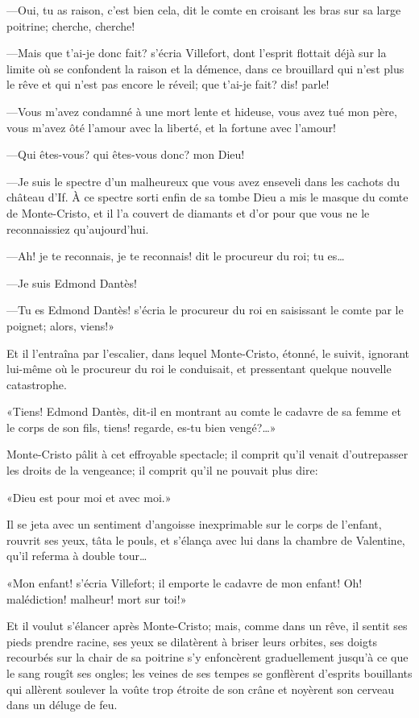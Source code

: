 —Oui, tu as raison, c'est bien cela, dit le comte en croisant les bras sur sa large poitrine; cherche, cherche! 

—Mais que t'ai-je donc fait? s'écria Villefort, dont l'esprit flottait déjà sur la limite où se confondent la raison et la démence, dans ce brouillard qui n'est plus le rêve et qui n'est pas encore le réveil; que t'ai-je fait? dis! parle! 

—Vous m'avez condamné à une mort lente et hideuse, vous avez tué mon père, vous m'avez ôté l'amour avec la liberté, et la fortune avec l'amour! 

—Qui êtes-vous? qui êtes-vous donc? mon Dieu! 

—Je suis le spectre d'un malheureux que vous avez enseveli dans les cachots du château d'If. À ce spectre sorti enfin de sa tombe Dieu a mis le masque du comte de Monte-Cristo, et il l'a couvert de diamants et d'or pour que vous ne le reconnaissiez qu'aujourd'hui. 

—Ah! je te reconnais, je te reconnais! dit le procureur du roi; tu es\dots 

—Je suis Edmond Dantès! 

—Tu es Edmond Dantès! s'écria le procureur du roi en saisissant le comte par le poignet; alors, viens!» 

Et il l'entraîna par l'escalier, dans lequel Monte-Cristo, étonné, le suivit, ignorant lui-même où le procureur du roi le conduisait, et pressentant quelque nouvelle catastrophe. 

«Tiens! Edmond Dantès, dit-il en montrant au comte le cadavre de sa femme et le corps de son fils, tiens! regarde, es-tu bien vengé?\dots» 

Monte-Cristo pâlit à cet effroyable spectacle; il comprit qu'il venait d'outrepasser les droits de la vengeance; il comprit qu'il ne pouvait plus dire: 

«Dieu est pour moi et avec moi.» 

Il se jeta avec un sentiment d'angoisse inexprimable sur le corps de l'enfant, rouvrit ses yeux, tâta le pouls, et s'élança avec lui dans la chambre de Valentine, qu'il referma à double tour\dots 

«Mon enfant! s'écria Villefort; il emporte le cadavre de mon enfant! Oh! malédiction! malheur! mort sur toi!» 

Et il voulut s'élancer après Monte-Cristo; mais, comme dans un rêve, il sentit ses pieds prendre racine, ses yeux se dilatèrent à briser leurs orbites, ses doigts recourbés sur la chair de sa poitrine s'y enfoncèrent graduellement jusqu'à ce que le sang rougît ses ongles; les veines de ses tempes se gonflèrent d'esprits bouillants qui allèrent soulever la voûte trop étroite de son crâne et noyèrent son cerveau dans un déluge de feu. 

